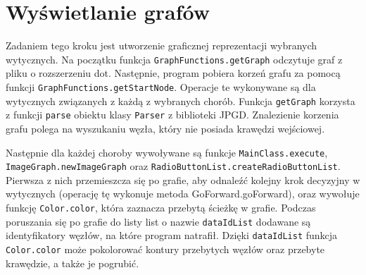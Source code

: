 \section{Wyświetlanie grafów}

Zadaniem tego kroku jest utworzenie graficznej reprezentacji wybranych wytycznych.
Na początku funkcja \texttt{GraphFunctions.getGraph} odczytuje graf z pliku o rozszerzeniu dot. Następnie, program pobiera 
korzeń grafu za pomocą funkcji \texttt{GraphFunctions.getStartNode}. Operacje te wykonywane są dla wytycznych związanych z każdą z wybranych chorób. Funkcja \texttt{getGraph} korzysta z funkcji \texttt{parse} obiektu klasy \texttt{Parser} z biblioteki JPGD. 
Znalezienie korzenia grafu polega na wyszukaniu węzła, który nie posiada 
krawędzi wejściowej. 

Następnie dla każdej choroby wywoływane są funkcje \texttt{MainClass.execute}, \texttt{ImageGraph.new\-ImageGraph} oraz \texttt{RadioButtonList.createRadioButtonList}. Pierwsza z nich przemieszcza się po grafie, 
aby odnaleźć kolejny krok decyzyjny w wytycznych (operację tę wykonuje metoda GoForward.goForward), oraz wywołuje funkcję \texttt{Color.color}, która zaznacza przebytą ścieżkę w grafie. Podczas poruszania się po grafie do listy list o nazwie \texttt{dataIdList} dodawane są identyfikatory węzłów, na które program natrafił. Dzięki \texttt{dataIdList} funkcja \texttt{Color.color} może pokolorować kontury przebytych węzłów oraz przebyte krawędzie, a także je pogrubić. 

